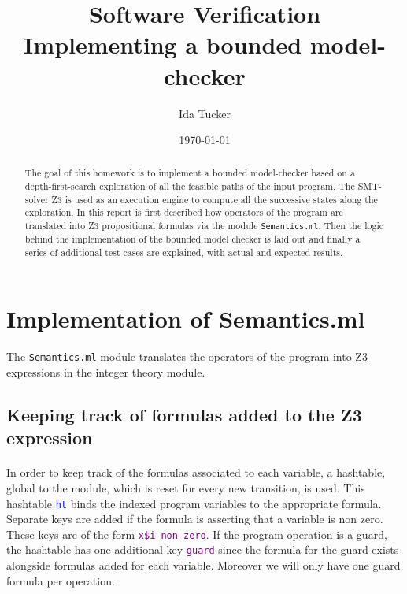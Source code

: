 \documentclass[letterpaper,12pt]{article}
\begin{document}
\title{Software Verification\\
Implementing a bounded model-checker}
\author{Ida Tucker}
\date{\today}
\maketitle

\begin{abstract}
The goal of this homework is to implement a bounded model-checker based on a depth-first-search exploration of all the feasible paths
of the input program. The SMT-solver Z3 is used as an
execution engine to compute all the successive states along the exploration. In this report is first described how operators of the program are translated into Z3 propositional formulas via the module \texttt{Semantics.ml}. Then the logic behind the implementation of the bounded model checker is laid out and finally a series of additional test cases are explained, with actual and expected results.
\end{abstract}


\section{Implementation of Semantics.ml}
\paragraph{}
The \texttt{Semantics.ml} module translates the operators of the program into Z3 expressions in the integer theory module.
\subsection{Keeping track of formulas added to the Z3 expression}
\paragraph{}
In order to keep track of the formulas associated to each variable, a hashtable, global to the module, which is reset for every new transition, is used. This hashtable \texttt{\textcolor{blue}{ht}} binds the indexed program variables to the appropriate formula.
Separate keys are added if the formula is asserting that a variable is non zero. These keys are of the form \textcolor{purple}{\texttt{x\$i-non-zero}}.
If the program operation is a guard, the hashtable has one additional key \textcolor{purple}{\texttt{guard}} since the formula for the guard exists alongside formulas added for each variable. Moreover we will only have one guard formula per operation.
\end{document}
